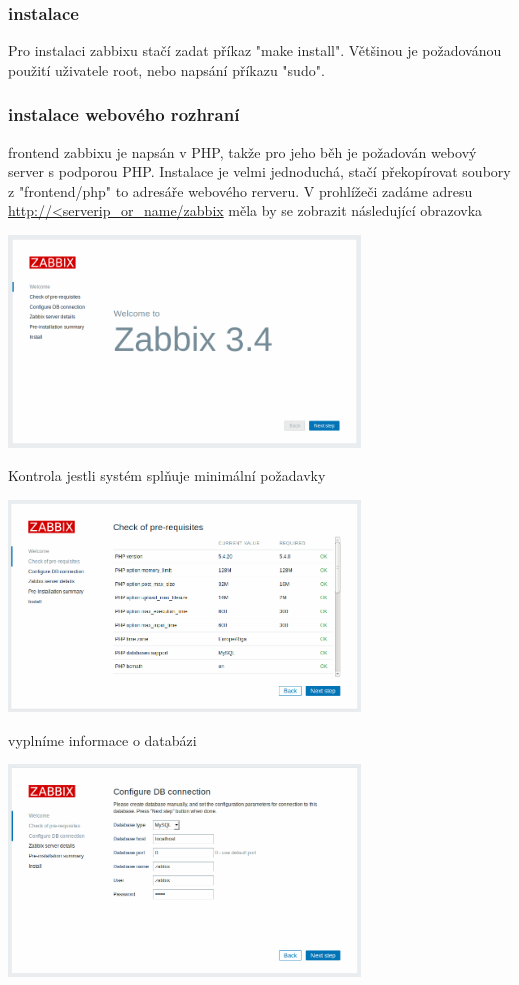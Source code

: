 \documentclass{article}
\begin{document}
\subsubsection{instalace}
Pro instalaci zabbixu stačí zadat příkaz "make install". Většinou je požadovánou použití uživatele root, nebo napsání příkazu "sudo".
\subsubsection{instalace webového rozhraní}
frontend zabbixu je napsán v PHP, takže pro jeho běh je požadován webový server s podporou PHP. Instalace je velmi jednoduchá, stačí překopírovat soubory z "frontend/php" to adresáře webového rerveru.
\newline
V prohlížeči zadáme adresu \url{http://<serverip_or_name/zabbix}
měla by se zobrazit následující obrazovka
\begin{center}
  \includegraphics[width=0.7\textwidth]{obrazky/install_1.png}
\end{center}
Kontrola jestli systém splňuje minimální požadavky
\begin{center}
  \includegraphics[width=0.7\textwidth]{obrazky/install_2.png}
\end{center}
vyplníme informace o databázi
\begin{center}
  \includegraphics[width=0.7\textwidth]{obrazky/install_3.png}
\end{center}
\end{document}
